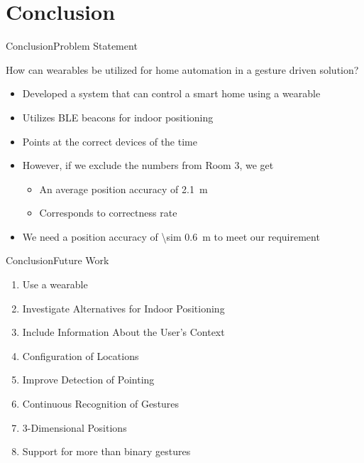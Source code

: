 \section{Conclusion}
\begin{frame}{Conclusion}{Problem Statement}
  \begin{framed}
    How can wearables be utilized for home automation in a gesture driven solution?
  \end{framed}
  
  \begin{itemize}
    \item<2-> Developed a system that can control a smart home using a wearable
    \item<2-> Utilizes BLE beacons for indoor positioning
    \item<2-> Points at the correct devices  of the time
    \item<2-> However, if we exclude the numbers from Room 3, we get
    \begin{itemize}
      \item<2-> An average position accuracy of \SI{2.1}{\meter}
      \item<2-> Corresponds to  correctness rate
    \end{itemize}
    \item<2-> We need a position accuracy of \SI{\sim 0.6}{\meter} to meet our requirement
  \end{itemize}
\end{frame}

\begin{frame}{Conclusion}{Future Work}
  \begin{enumerate}
    \item Use a wearable
    \item Investigate Alternatives for Indoor Positioning 
    \item Include Information About the User's Context
    \item Configuration of Locations
    \item Improve Detection of Pointing
    \item Continuous Recognition of Gestures
    \item 3-Dimensional Positions
    \item Support for more than binary gestures
  \end{enumerate}
\end{frame}
